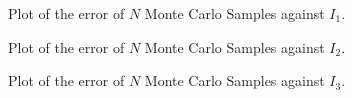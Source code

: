 \begin{figure}[htbp]
    \centering
    
    \caption{Plot of the error of $N$ Monte Carlo Samples against $I_1$.}
    \label{fig:2-2-integral-1}
\end{figure}

\begin{figure}[htbp]
    \centering
    
    \caption{Plot of the error of $N$ Monte Carlo Samples against $I_2$.}
    \label{fig:2-2-integral-2}
\end{figure}

\begin{figure}[htbp]
    \centering
    
    \caption{Plot of the error of $N$ Monte Carlo Samples against $I_3$.}
    \label{fig:2-2-integral-3}
\end{figure}